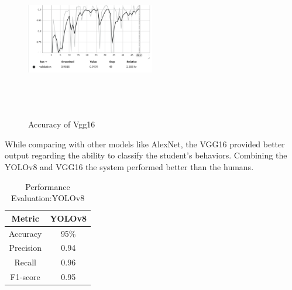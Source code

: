 \documentclass[conference]{IEEEtran}
\begin{document}
\begin{figure}[htbp]
\centering
\includegraphics[width=0.5\textwidth, height=7cm]{images/Vgg16acc.png}  %
\caption{Accuracy of Vgg16}
\label{fig}
\end{figure}

While comparing with other models like AlexNet, the VGG16 provided better output regarding the ability to classify the student's behaviors. Combining the YOLOv8 and VGG16 the system performed better than the humans. 




\begin{table}[htbp]
\caption{Performance Evaluation:YOLOv8}
\label{tab2} %
\begin{center}
\begin{tabular}{|c|c|}
\hline
\textbf{Metric} & \textbf{YOLOv8} \\ %
\hline
Accuracy & 95\% \\ %

\hline
Precision&0.94\\
\hline
Recall&0.96\\
\hline
 F1-score&0.95 \\

\hline
\end{tabular}
\end{center}
\end{table}
\end{document}
